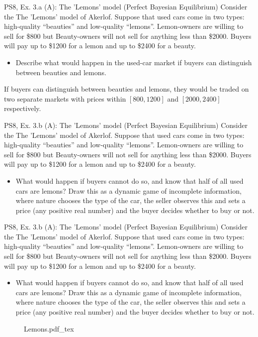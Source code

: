 \begin{frame}{PS8, Ex. 3.a (A): The 'Lemons' model (Perfect Bayesian Equilibrium)}
    Consider the The 'Lemons' model of Akerlof. Suppose that used cars come in two types: high-quality “beauties” and low-quality “lemons”. Lemon-owners are willing to sell for \$800 but Beauty-owners will not sell for anything less than \$2000. Buyers will pay up to \$1200 for a lemon and up to \$2400 for a beauty.
    \begin{itemize}
      \item[(a)] Describe what would happen in the used-car market if buyers can distinguish between beauties and lemons.
    \end{itemize}
    If buyers can distinguish between beauties and lemons, they would be traded on two separate markets with prices within $[800,1200]$ and $[2000,2400]$ respectively.
    \vfill\null
\end{frame}

\begin{frame}{PS8, Ex. 3.b (A): The 'Lemons' model (Perfect Bayesian Equilibrium)}
    Consider the The 'Lemons' model of Akerlof. Suppose that used cars come in two types: high-quality “beauties” and low-quality “lemons”. Lemon-owners are willing to sell for \$800 but Beauty-owners will not sell for anything less than \$2000. Buyers will pay up to \$1200 for a lemon and up to \$2400 for a beauty.
    \vspace{-4pt}
    \begin{itemize}
      \item[(b)] What would happen if buyers cannot do so, and know that half of all used cars are lemons? Draw this as a dynamic game of incomplete information, where nature chooses the type of the car, the seller observes this and sets a price (any positive real number) and the buyer decides whether to buy or not.
    \end{itemize}
    \vfill\null
\end{frame}
\begin{frame}{PS8, Ex. 3.b (A): The 'Lemons' model (Perfect Bayesian Equilibrium)}
    Consider the The 'Lemons' model of Akerlof. Suppose that used cars come in two types: high-quality “beauties” and low-quality “lemons”. Lemon-owners are willing to sell for \$800 but Beauty-owners will not sell for anything less than \$2000. Buyers will pay up to \$1200 for a lemon and up to \$2400 for a beauty.
    \vspace{-4pt}
    \begin{itemize}
      \item[(b)] What would happen if buyers cannot do so, and know that half of all used cars are lemons? Draw this as a dynamic game of incomplete information, where nature chooses the type of the car, the seller observes this and sets a price (any positive real number) and the buyer decides whether to buy or not.
    \end{itemize}
    \begin{figure}[!h]
      \center {}
      {Lemons.pdf_tex}
    \end{figure}
    \vfill\null
\end{frame}


